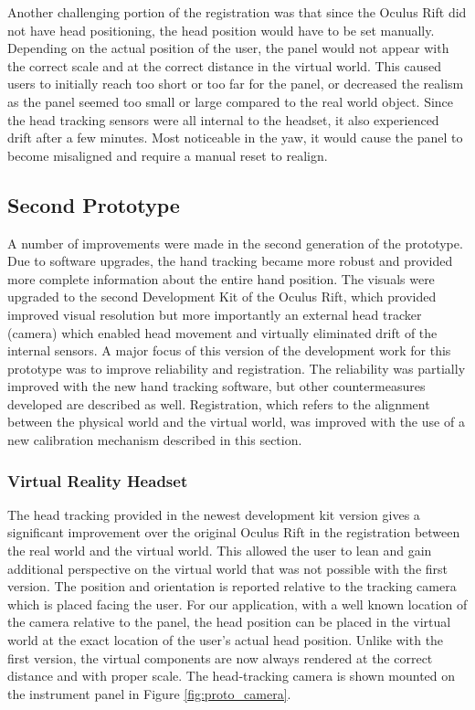 Another challenging portion of the registration was that since the Oculus Rift did not have head positioning, the head position would have to be set manually.
Depending on the actual position of the user, the panel would not appear with the correct scale and at the correct distance in the virtual world.
This caused users to initially reach too short or too far for the panel, or decreased the realism as the panel seemed too small or large compared to the real world object.
Since the head tracking sensors were all internal to the headset, it also experienced drift after a few minutes.
Most noticeable in the yaw, it would cause the panel to become misaligned and require a manual reset to realign.

\subsection{Second Prototype}

A number of improvements were made in the second generation of the prototype.
Due to software upgrades, the hand tracking became more robust and provided more complete information about the entire hand position.
The visuals were upgraded to the second Development Kit of the Oculus Rift, which provided improved visual resolution but more importantly an external head tracker (camera) which enabled head movement and virtually eliminated drift of the internal sensors.
A major focus of this version of the development work for this prototype was to improve reliability and registration.
The reliability was partially improved with the new hand tracking software, but other countermeasures developed are described as well.
Registration, which refers to the alignment between the physical world and the virtual world, was improved with the use of a new calibration mechanism described in this section.

\subsubsection{Virtual Reality Headset}

The head tracking provided in the newest development kit version gives a significant improvement over the original Oculus Rift in the registration between the real world and the virtual world.
This allowed the user to lean and gain additional perspective on the virtual world that was not possible with the first version.
The position and orientation is reported relative to the tracking camera which is placed facing the user.
For our application, with a well known location of the camera relative to the panel, the head position can be placed in the virtual world at the exact location of the user's actual head position.
Unlike with the first version, the virtual components are now always rendered at the correct distance and with proper scale.
The head-tracking camera is shown mounted on the instrument panel in Figure \ref{fig:proto_camera}.

